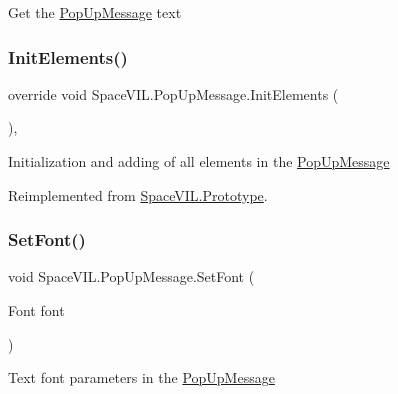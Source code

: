 Get the \mbox{\hyperlink{class_space_v_i_l_1_1_pop_up_message}{Pop\+Up\+Message}} text 

\mbox{\label{class_space_v_i_l_1_1_pop_up_message_a34573fddbd8492ec1261c65f59dd3bbb}} 
\subsubsection{\texorpdfstring{Init\+Elements()}{InitElements()}}
{\footnotesize\ttfamily override void Space\+V\+I\+L.\+Pop\+Up\+Message.\+Init\+Elements (\begin{DoxyParamCaption}{ }\end{DoxyParamCaption})\hspace{0.3cm}{\ttfamily [inline]}, {\ttfamily [virtual]}}



Initialization and adding of all elements in the \mbox{\hyperlink{class_space_v_i_l_1_1_pop_up_message}{Pop\+Up\+Message}} 



Reimplemented from \mbox{\hyperlink{class_space_v_i_l_1_1_prototype_ac3379fe02923ee155b5b0084abf27420}{Space\+V\+I\+L.\+Prototype}}.

\mbox{\label{class_space_v_i_l_1_1_pop_up_message_a06b40259435cf6916dc11467eec83d01}} 
\subsubsection{\texorpdfstring{Set\+Font()}{SetFont()}}
{\footnotesize\ttfamily void Space\+V\+I\+L.\+Pop\+Up\+Message.\+Set\+Font (\begin{DoxyParamCaption}\item[{Font}]{font }\end{DoxyParamCaption})\hspace{0.3cm}{\ttfamily [inline]}}



Text font parameters in the \mbox{\hyperlink{class_space_v_i_l_1_1_pop_up_message}{Pop\+Up\+Message}} 

